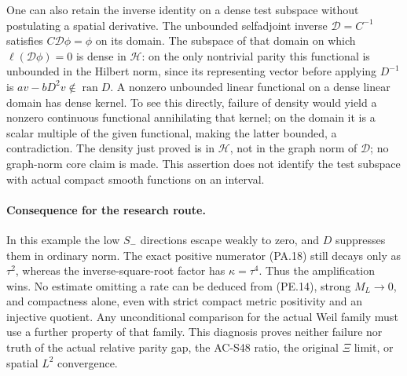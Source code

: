 One can also retain the inverse identity on a dense test subspace without
postulating a spatial derivative.  The unbounded selfadjoint
inverse \(\mathcal D=C^{-1}\) satisfies \(C\mathcal D\phi=\phi\)
on its domain.  The subspace of that domain on which
\(\ell(\mathcal D\phi)=0\) is dense in \(\mathcal H\): on the
only nontrivial parity this functional is unbounded in the
Hilbert norm, since its representing vector before applying
\(D^{-1}\) is \(av-bD^2v\notin\operatorname{ran}D\).
A nonzero unbounded linear functional on a dense linear domain
has dense kernel.  To see this directly, failure of density
would yield a nonzero continuous functional annihilating that
kernel; on the domain it is a scalar multiple of the given
functional, making the latter bounded, a contradiction.
The density just proved is in \(\mathcal H\), not in the graph
norm of \(\mathcal D\); no graph-norm core claim is made.
This assertion does not identify the test subspace with actual
compact smooth functions on an interval.

\paragraph{Consequence for the research route.}
In this example the low \(S_-\) directions escape weakly to zero,
and \(D\) suppresses them in ordinary norm.  The exact positive
numerator (PA.18) still decays only as \(\tau^2\), whereas the
inverse-square-root factor has \(\kappa=\tau^4\).  Thus the
amplification wins.  No estimate omitting a rate can be deduced
from (PE.14), strong \(M_L\to0\), and compactness alone, even
with strict compact metric positivity and an injective quotient.
Any unconditional comparison for the actual Weil family must
use a further property of that family.  This diagnosis proves
neither failure nor truth of the actual relative parity gap,
the AC-S48 ratio, the original \(\Xi\) limit, or spatial
\(L^2\) convergence.
